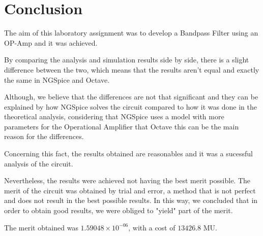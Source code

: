 \newpage
\section{Conclusion}
\label{sec:conclusion}

\hspace{0,5cm} The aim of this laboratory assignment was to develop a Bandpass Filter using an OP-Amp and it was achieved. 

\par By comparing the analysis and simulation results side by side, there is a slight difference between the two, which means that the results aren't equal and exactly the same in NGSpice and Octave. 
\par Although, we believe that the differences are not that significant and they can be explained by how NGSpice solves the circuit compared to how it was done in the theoretical analysis, considering that NGSpice uses a model with more parameters for the Operational Amplifier that Octave this can be the main reason for the differences. 
\par Concerning this fact, the results obtained are reasonables and it was a sucessful analysis of the circuit.
\par Nevertheless, the results were achieved not having the best merit possible. The merit of the circuit was obtained by trial and error, a method that is not perfect and does not result in the best possible results. In this way, we concluded that in order to obtain good results, we were obliged to "yield" part of the merit.
\par The merit obtained was $1.59048 \times 10^{-06}$, with a cost of $13426.8$ MU.



